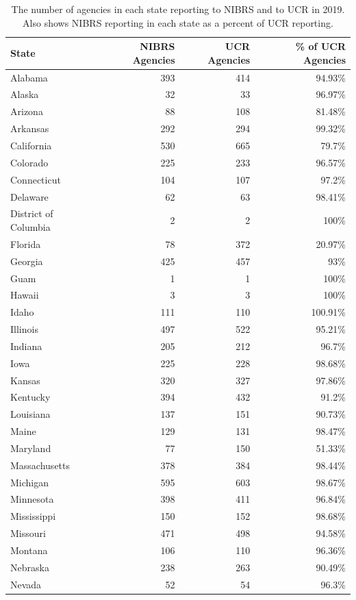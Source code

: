\documentclass[
  12pt,
  openany]{book}
\begin{document}
\begin{longtable}[t]{lrrr}
\caption{\label{tab:agenciesReportingTable}The number of agencies in each state reporting to NIBRS and to UCR in 2019. Also shows NIBRS reporting in each state as a percent of UCR reporting.}\\
\toprule
State & NIBRS Agencies & UCR Agencies & \% of UCR Agencies\\
\midrule
Alabama & 393 & 414 & 94.93\%\\
Alaska & 32 & 33 & 96.97\%\\
Arizona & 88 & 108 & 81.48\%\\
Arkansas & 292 & 294 & 99.32\%\\
California & 530 & 665 & 79.7\%\\
\addlinespace
Colorado & 225 & 233 & 96.57\%\\
Connecticut & 104 & 107 & 97.2\%\\
Delaware & 62 & 63 & 98.41\%\\
District of Columbia & 2 & 2 & 100\%\\
Florida & 78 & 372 & 20.97\%\\
\addlinespace
Georgia & 425 & 457 & 93\%\\
Guam & 1 & 1 & 100\%\\
Hawaii & 3 & 3 & 100\%\\
Idaho & 111 & 110 & 100.91\%\\
Illinois & 497 & 522 & 95.21\%\\
\addlinespace
Indiana & 205 & 212 & 96.7\%\\
Iowa & 225 & 228 & 98.68\%\\
Kansas & 320 & 327 & 97.86\%\\
Kentucky & 394 & 432 & 91.2\%\\
Louisiana & 137 & 151 & 90.73\%\\
\addlinespace
Maine & 129 & 131 & 98.47\%\\
Maryland & 77 & 150 & 51.33\%\\
Massachusetts & 378 & 384 & 98.44\%\\
Michigan & 595 & 603 & 98.67\%\\
Minnesota & 398 & 411 & 96.84\%\\
\addlinespace
Mississippi & 150 & 152 & 98.68\%\\
Missouri & 471 & 498 & 94.58\%\\
Montana & 106 & 110 & 96.36\%\\
Nebraska & 238 & 263 & 90.49\%\\
Nevada & 52 & 54 & 96.3\%\\

\end{longtable}
\end{document}
